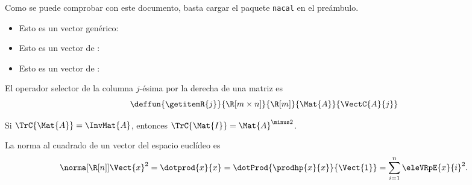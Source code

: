 \documentclass{article}
\begin{document}
Como se puede comprobar con este documento, basta cargar el paquete
\texttt{nacal} en el preámbulo.
\bigskip

\begin{itemize}
\item Esto es un vector genérico:\; 
\item Esto es un vector de \R[n]:\; 
\item Esto es un vector de \R[m\times n]:\; 
\end{itemize}

El operador selector de la columna $j$-ésima por la derecha de una matriz es
\begin{displaymath}
  \deffun{\getitemR{j}}{\R[m\times n]}{\R[m]}{\Mat{A}}{\VectC{A}{j}}
\end{displaymath}


Si $\TrC{\Mat{A}}=\InvMat{A}$, entonces $\TrC{\Mat{I}}=\Mat{A}^{\minus2}$.
\bigskip

La norma al cuadrado de un vector del espacio euclídeo \R[n] es
\[
  \norma[\R[n]]{\Vect{x}}^2=
  \dotprod{x}{x}=
  \dotProd{\prodhp{x}{x}}{\Vect{1}}=
  \sum_{i=1}^n\eleVRpE{x}{i}^2.
\]
\end{document}
